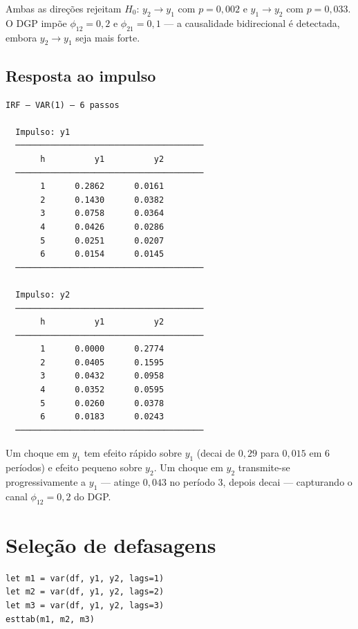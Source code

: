 Ambas as direções rejeitam $H_0$: $y_2 \to y_1$ com $p = 0{,}002$ e
$y_1 \to y_2$ com $p = 0{,}033$. O DGP impõe $\phi_{12} = 0{,}2$ e
$\phi_{21} = 0{,}1$ — a causalidade bidirecional é detectada, embora
$y_2 \to y_1$ seja mais forte.

\subsection*{Resposta ao impulso}

\begin{lstlisting}[language={}, basicstyle=\ttfamily\small,
  frame=none, numbers=none, backgroundcolor=\color{codbg},
  xleftmargin=0pt, xrightmargin=0pt, breaklines=false]
IRF — VAR(1) — 6 passos

  Impulso: y1
  ──────────────────────────────────────
       h          y1          y2
  ──────────────────────────────────────
       1      0.2862      0.0161
       2      0.1430      0.0382
       3      0.0758      0.0364
       4      0.0426      0.0286
       5      0.0251      0.0207
       6      0.0154      0.0145
  ──────────────────────────────────────

  Impulso: y2
  ──────────────────────────────────────
       h          y1          y2
  ──────────────────────────────────────
       1      0.0000      0.2774
       2      0.0405      0.1595
       3      0.0432      0.0958
       4      0.0352      0.0595
       5      0.0260      0.0378
       6      0.0183      0.0243
  ──────────────────────────────────────
\end{lstlisting}

Um choque em $y_1$ tem efeito rápido sobre $y_1$ (decai de $0{,}29$ para
$0{,}015$ em 6 períodos) e efeito pequeno sobre $y_2$. Um choque em $y_2$
transmite-se progressivamente a $y_1$ — atinge $0{,}043$ no período 3,
depois decai — capturando o canal $\phi_{12} = 0{,}2$ do DGP.

\section{Seleção de defasagens}

\begin{lstlisting}[caption={Comparação por número de defasagens}]
let m1 = var(df, y1, y2, lags=1)
let m2 = var(df, y1, y2, lags=2)
let m3 = var(df, y1, y2, lags=3)
esttab(m1, m2, m3)
\end{lstlisting}

